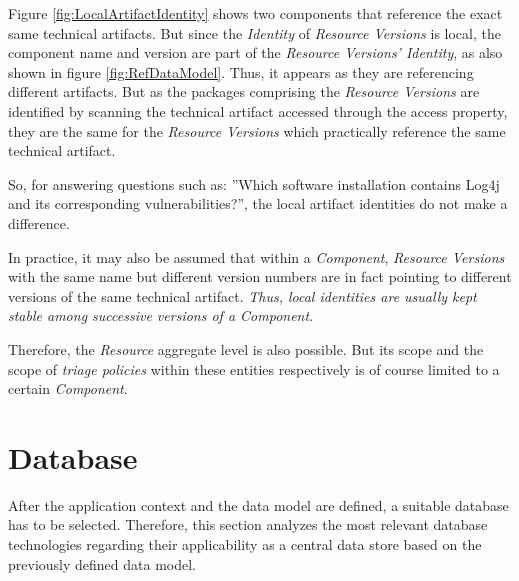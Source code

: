 Figure \ref{fig:LocalArtifactIdentity} shows two components that reference the exact same technical artifacts. But since the \emph{Identity} of \emph{Resource Versions} is local, the component name and version are part of the \emph{Resource Versions' Identity}, as also shown in figure \ref{fig:RefDataModel}. Thus, it appears as they are referencing different artifacts. But as the packages comprising the \emph{Resource Versions} are identified by scanning the technical artifact accessed through the access property, they are the same for the \emph{Resource Versions} which practically reference the same technical artifact.\par 
So, for answering questions such as: ''Which software installation contains Log4j and its corresponding vulnerabilities?'', the local artifact identities do not make a difference.\par 
In practice, it may also be assumed that within a \emph{Component}, \emph{Resource Versions} with the same name but different version numbers are in fact pointing to different versions of the same technical artifact. \emph{Thus, local identities are usually kept stable among successive versions of a Component}.\par 
Therefore, the \emph{Resource} aggregate level is also possible. But its scope and the scope of \emph{triage policies} within these entities respectively is of course limited to a certain \emph{Component}.

\section{Database}
After the application context and the data model are defined, a suitable database has to be selected. Therefore, this section analyzes the most relevant database technologies regarding their applicability as a central data store based on the previously defined data model.

